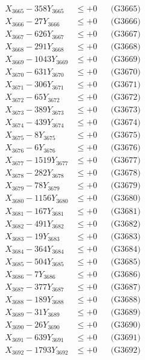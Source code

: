 \documentclass[a4paper,10pt]{article}
\begin{document}
{\begin{align}
X_{3665} - 358Y_{3665} &\leq +0 && \text{(G3665)} \\
X_{3666} - 27Y_{3666} &\leq +0 && \text{(G3666)} \\
X_{3667} - 626Y_{3667} &\leq +0 && \text{(G3667)} \\
X_{3668} - 291Y_{3668} &\leq +0 && \text{(G3668)} \\
X_{3669} - 1043Y_{3669} &\leq +0 && \text{(G3669)} \\
X_{3670} - 631Y_{3670} &\leq +0 && \text{(G3670)} \\
\allowbreak
X_{3671} - 306Y_{3671} &\leq +0 && \text{(G3671)} \\
X_{3672} - 65Y_{3672} &\leq +0 && \text{(G3672)} \\
X_{3673} - 389Y_{3673} &\leq +0 && \text{(G3673)} \\
X_{3674} - 439Y_{3674} &\leq +0 && \text{(G3674)} \\
X_{3675} - 8Y_{3675} &\leq +0 && \text{(G3675)} \\
X_{3676} - 6Y_{3676} &\leq +0 && \text{(G3676)} \\
X_{3677} - 1519Y_{3677} &\leq +0 && \text{(G3677)} \\
X_{3678} - 282Y_{3678} &\leq +0 && \text{(G3678)} \\
X_{3679} - 78Y_{3679} &\leq +0 && \text{(G3679)} \\
X_{3680} - 1156Y_{3680} &\leq +0 && \text{(G3680)} \\
\allowbreak
X_{3681} - 167Y_{3681} &\leq +0 && \text{(G3681)} \\
X_{3682} - 491Y_{3682} &\leq +0 && \text{(G3682)} \\
X_{3683} - 19Y_{3683} &\leq +0 && \text{(G3683)} \\
X_{3684} - 364Y_{3684} &\leq +0 && \text{(G3684)} \\
X_{3685} - 504Y_{3685} &\leq +0 && \text{(G3685)} \\
X_{3686} - 7Y_{3686} &\leq +0 && \text{(G3686)} \\
X_{3687} - 377Y_{3687} &\leq +0 && \text{(G3687)} \\
X_{3688} - 189Y_{3688} &\leq +0 && \text{(G3688)} \\
X_{3689} - 31Y_{3689} &\leq +0 && \text{(G3689)} \\
X_{3690} - 26Y_{3690} &\leq +0 && \text{(G3690)} \\
\allowbreak
X_{3691} - 639Y_{3691} &\leq +0 && \text{(G3691)} \\
X_{3692} - 1793Y_{3692} &\leq +0 && \text{(G3692)} \\

\end{align}}
\end{document}

